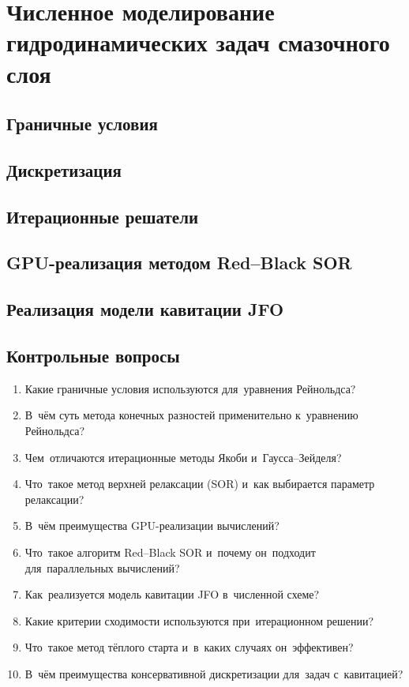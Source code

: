 \chapter{Численное моделирование гидродинамических задач смазочного слоя}

\section{Граничные условия}


\FloatBarrier
\section{Дискретизация}


\FloatBarrier
\section{Итерационные решатели}


\FloatBarrier
\section{GPU-реализация методом Red--Black SOR}


\FloatBarrier
\section{Реализация модели кавитации JFO}


% 

\FloatBarrier
\section*{Контрольные вопросы}

\begin{enumerate}
\item Какие граничные условия используются для~уравнения Рейнольдса?
\item В~чём суть метода конечных разностей применительно к~уравнению Рейнольдса?
\item Чем~отличаются итерационные методы Якоби и~Гаусса--Зейделя?
\item Что~такое метод верхней релаксации (SOR) и~как выбирается параметр релаксации?
\item В~чём преимущества GPU-реализации вычислений?
\item Что~такое алгоритм Red--Black SOR и~почему он~подходит для~параллельных вычислений?
\item Как~реализуется модель кавитации JFO в~численной схеме?
\item Какие критерии сходимости используются при~итерационном решении?
\item Что~такое метод тёплого старта и~в~каких случаях он~эффективен?
\item В~чём преимущества консервативной дискретизации для~задач с~кавитацией?
\end{enumerate}

